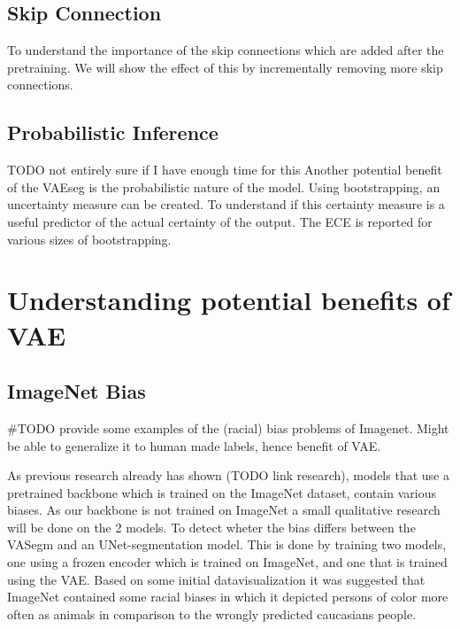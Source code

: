 \subsection{Skip Connection}
To understand the importance of the skip connections which are added after the pretraining. We will show the effect of this by incrementally removing more skip connections.

\subsection{Probabilistic Inference}
TODO not entirely sure if I have enough time for this
Another potential benefit of the VAEseg is the probabilistic nature of the model. Using bootstrapping, an uncertainty measure can be created. To understand if this certainty measure is a useful predictor of the actual certainty of the output. The ECE is reported for various sizes of bootstrapping.

\section{Understanding potential benefits of VAE}
\subsection*{ImageNet Bias}
\#TODO provide some examples of the (racial) bias problems of Imagenet. Might be able to generalize it to human made labels, hence benefit of VAE.

As previous research already has shown (TODO link research), models that use a pretrained backbone which is trained on the ImageNet dataset, contain various biases. As our backbone is not trained on ImageNet a small qualitative research will be done on the 2 models. To detect wheter the bias differs between the VASegm and an UNet-segmentation model. This is done by training two models, one using a frozen encoder which is trained on ImageNet, and one that is trained using the VAE. Based on some initial datavisualization it was suggested that ImageNet contained some racial biases in which it depicted persons of color more often as animals in comparison to the wrongly predicted caucasians people.



